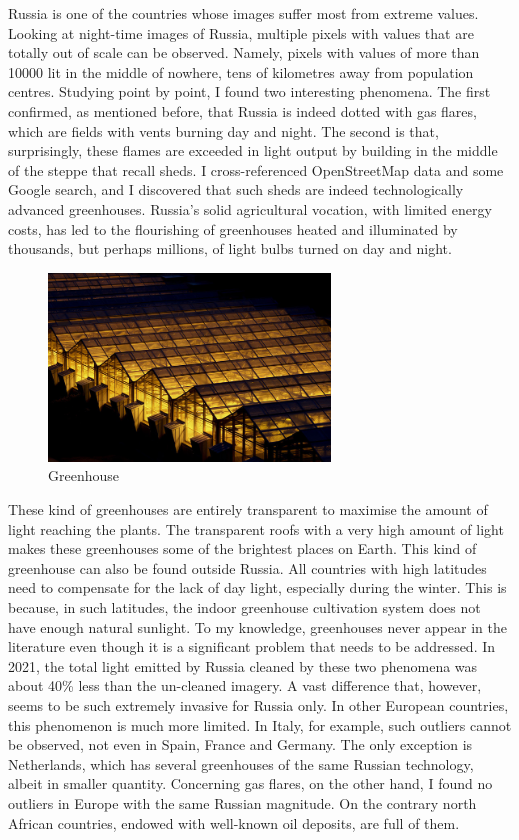  Russia is one of the countries whose images suffer most from extreme values. Looking at night-time images of Russia, multiple pixels with values that are totally out of scale can be observed. Namely, pixels with values of more than 10000 lit in the middle of nowhere, tens of kilometres away from population centres.
Studying point by point, I found two interesting phenomena. The first confirmed, as mentioned before, that Russia is indeed dotted with gas flares, which are fields with vents burning day and night. The second is that, surprisingly, these flames are exceeded in light output by building in the middle of the steppe that recall sheds. I cross-referenced OpenStreetMap data and some Google search, and I discovered that such sheds are indeed technologically advanced greenhouses. Russia's solid agricultural vocation, with limited energy costs, has led to the flourishing of greenhouses heated and illuminated by thousands, but perhaps millions, of light bulbs turned on day and night. 
\begin{figure}
    \centering
    \includegraphics[width=7.5cm]{images/greenhousesatnight.jpg}
    \caption{Greenhouse}
    \label{fig:my_label}
\end{figure}
These kind of greenhouses are entirely transparent to maximise the amount of light reaching the plants. The transparent roofs with a very high amount of light makes these greenhouses some of the brightest places on Earth. This kind of greenhouse can also be found outside Russia. All countries with high latitudes need to compensate for the lack of day light, especially during the winter. This is because, in such latitudes, the indoor greenhouse cultivation system does not have enough natural sunlight. To my knowledge, greenhouses never appear in the literature even though it is a significant problem that needs to be addressed. In 2021, the total light emitted by Russia cleaned by these two phenomena was about 40\% less than the un-cleaned imagery. A vast difference that, however, seems to be such extremely invasive for Russia only. In other European countries, this phenomenon is much more limited. In Italy, for example, such outliers cannot be observed, not even in Spain, France and Germany. The only exception is Netherlands, which has several greenhouses of the same Russian technology, albeit in smaller quantity.
Concerning gas flares, on the other hand, I found no outliers in Europe with the same Russian magnitude. On the contrary north African countries, endowed with well-known oil deposits, are full of them. 


